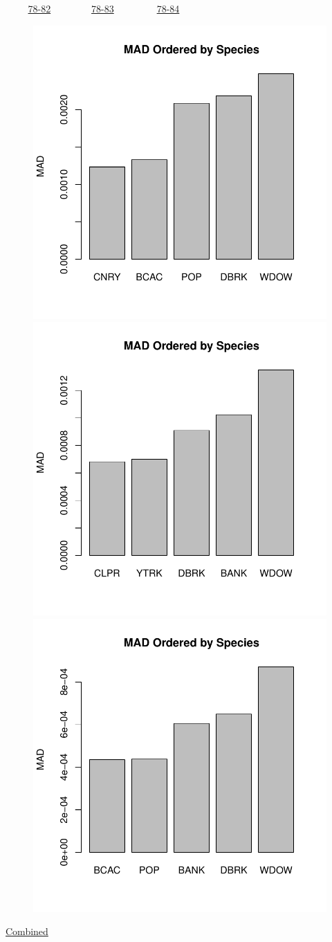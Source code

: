 \documentclass[ xcolor = pdftex, dvipsnames, table ]{beamer}
\begin{document}
\begin{frame}{$~~~~~~~~~$ \href{https://github.com/gasduster99/sppComp/tree/master/sscRuns/26919781982M4}{78-82} $~~~~~~~~~~~~~~~~$ \href{https://github.com/gasduster99/sppComp/tree/master/sscRuns/26919781983M4}{78-83} $~~~~~~~~~~~~~~~~~$ \href{https://github.com/gasduster99/sppComp/tree/master/sscRuns/26919781984M4}{78-84} }
        \begin{figure}[ht!]
        \centering
        \hspace*{-1cm}
        \includegraphics[width=.4\textwidth]{../sscRuns/26919781982M4/sppTailMad68.pdf}
        \includegraphics[width=.4\textwidth]{../sscRuns/26919781983M4/sppTailMad68.pdf}
        \includegraphics[width=.4\textwidth]{../sscRuns/26919781984M4/sppTailMad68.pdf}
        \end{figure}
	\vspace{-1cm}
	\begin{center}
	\Large
	\href{https://github.com/gasduster99/sppComp/tree/master/try1/postSSC/26919781982345M4}{Combined}
	\end{center}
\end{frame}
\end{document}
